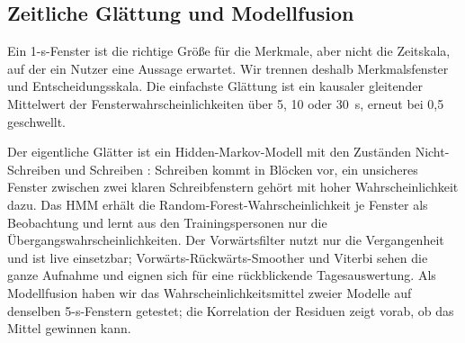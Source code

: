 \subsection{Zeitliche Glättung und Modellfusion}
\label{sec:smoothing}

Ein 1-s-Fenster ist die richtige Größe für die Merkmale, aber nicht die
Zeitskala, auf der ein Nutzer eine Aussage erwartet. Wir trennen deshalb
Merkmalsfenster und Entscheidungsskala. Die einfachste Glättung ist ein
kausaler gleitender Mittelwert der Fensterwahrscheinlichkeiten über 5, 10
oder 30~s, erneut bei 0,5 geschwellt.

Der eigentliche Glätter ist ein Hidden-Markov-Modell mit den Zuständen
Nicht-Schreiben und Schreiben \citep{rabiner1989}: Schreiben kommt in
Blöcken vor, ein unsicheres Fenster zwischen zwei klaren Schreibfenstern
gehört mit hoher Wahrscheinlichkeit dazu. Das HMM erhält die
Random-Forest-Wahrscheinlichkeit je Fenster als Beobachtung und lernt aus den
Trainingspersonen nur die Übergangswahrscheinlichkeiten. Der Vorwärtsfilter
nutzt nur die Vergangenheit und ist live einsetzbar; Vorwärts-Rückwärts-Smoother
und Viterbi sehen die ganze Aufnahme und eignen sich für eine rückblickende
Tagesauswertung. Als Modellfusion haben wir das Wahrscheinlichkeitsmittel
zweier Modelle auf denselben 5-s-Fenstern getestet; die Korrelation der
Residuen zeigt vorab, ob das Mittel gewinnen kann.
